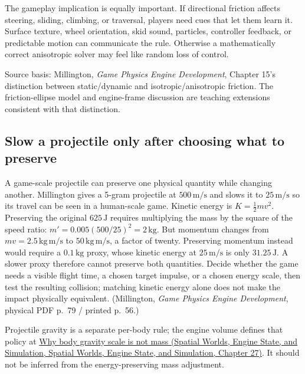 The gameplay implication is equally important. If directional friction affects steering, sliding, climbing, or traversal, players need cues that let them learn it. Surface texture, wheel orientation, skid sound, particles, controller feedback, or predictable motion can communicate the rule. Otherwise a mathematically correct anisotropic solver may feel like random loss of control.

Source basis: Millington, \emph{Game Physics Engine Development}, Chapter 15's distinction between static/dynamic and isotropic/anisotropic friction. The friction-ellipse model and engine-frame discussion are teaching extensions consistent with that distinction.

\subsection{Slow a projectile only after choosing what to preserve}\label{06-engine-ii-ch047-slow-a-projectile-only-after-choosing-what-to-preserve}

A game-scale projectile can preserve one physical quantity while changing another. Millington gives a 5-gram projectile at \(500\,\mathrm{m/s}\) and slows it to \(25\,\mathrm{m/s}\) so its travel can be seen in a human-scale game. Kinetic energy is \(K=\tfrac12mv^2\). Preserving the original \(625\,\mathrm J\) requires multiplying the mass by the square of the speed ratio: \(m'=0.005(500/25)^2=2\,\mathrm{kg}\). But momentum changes from \(mv=2.5\,\mathrm{kg\,m/s}\) to \(50\,\mathrm{kg\,m/s}\), a factor of twenty. Preserving momentum instead would require a \(0.1\,\mathrm{kg}\) proxy, whose kinetic energy at \(25\,\mathrm{m/s}\) is only \(31.25\,\mathrm J\). A slower proxy therefore cannot preserve both quantities. Decide whether the game needs a visible flight time, a chosen target impulse, or a chosen energy scale, then test the resulting collision; matching kinetic energy alone does not make the impact physically equivalent. (Millington, \emph{Game Physics Engine Development}, physical PDF p.~79 / printed p.~56.)

Projectile gravity is a separate per-body rule; the engine volume defines that policy at \href{../05-Spatial-Worlds-Engine-State-and-Simulation/main.pdf\#nameddest=06-engine-ii-ch038-why-body-gravity-scale-is-not-mass}{Why body gravity scale is not mass (Spatial Worlds, Engine State, and Simulation, Spatial Worlds, Engine State, and Simulation, Chapter 27)}. It should not be inferred from the energy-preserving mass adjustment.

